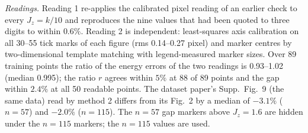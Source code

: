 \documentclass[aps,prx,onecolumn,10pt,nofootinbib,longbibliography,floatfix]{revtex4-2}
\theoremstyle{remark}
\newcommand{\Jz}{J_z}
\begin{document}
\emph{Readings.} Reading 1 re-applies the calibrated pixel reading of an earlier check to every $\Jz=k/10$ and %
reproduces the nine values that had been quoted to three digits to within $0.6\%$. Reading 2 is independent: %
least-squares axis calibration on all 30--55 tick marks of each figure (rms 0.14--0.27 pixel) and marker centres by %
two-dimensional template matching with legend-measured marker sizes. Over 89 training points the ratio of the energy %
errors of the two readings is 0.93--1.02 (median 0.995); the ratio $r$ agrees within $5\%$ at 88 of 89 points and the %
gap within $2.4\%$ at all 50 readable points. The dataset paper's Supp.\ Fig.~9 (the same data) read by method 2 %
differs from its Fig.~2 by a median of $-3.1\%$ ($n=57$) and $-2.0\%$ ($n=115$). The $n=57$ gap markers above %
$\Jz=1.6$ are hidden under the $n=115$ markers; the $n=115$ values are used. %
\end{document}

